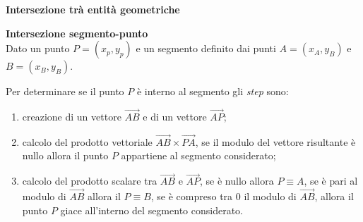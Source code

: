 \documentclass[xcolor=dvipsnames]{beamer} %
\begin{document}
\begin{frame}[fragile]
	\begin{center}
		\huge{\textbf{Intersezione trà entità geometriche}}
	\end{center}
\end{frame}

\begin{frame}[fragile]
	\Large{\textbf{Intersezione segmento-punto}}
	\normalsize
	\\[0.2cm]
	Dato un punto $P = (x_p, y_p)$ e un segmento definito dai punti $A = (x_A, y_B)$ e $B = (x_B, y_B)$.
	\begin{figure}[h!]
		\centering
	\end{figure}
	\noindent
	Per determinare se il punto $P$ è interno al segmento gli \textit{step} sono:
	\begin{enumerate}
		\item creazione di un vettore $\vec{AB}$ e di un vettore $\vec{AP}$;
		\item calcolo del prodotto vettoriale  $\vec{AB} \times  \vec{PA}$, se il modulo del vettore risultante è nullo allora il punto $P$ appartiene al segmento considerato;
		\item calcolo del prodotto scalare tra $\vec{AB}$ e $\vec{AP}$, se è nullo allora $P \equiv A$, se è pari al modulo di $\vec{AB}$ allora il $P \equiv B$, se è compreso tra 0 il modulo di $\vec{AB}$, allora il punto $P$ giace all'interno del segmento considerato.
	\end{enumerate}
\end{frame}
\end{document}
